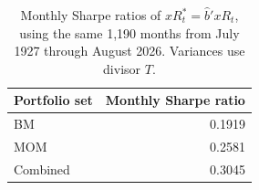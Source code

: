\begin{table}[!htbp]
  \centering
  \caption{Monthly Sharpe ratios of $xR_t^*=\hat b'xR_t$, using the same
  1,190 months from July 1927 through August 2026. Variances use divisor $T$.}
  \label{tab:q2c-monthly-sharpe-ratios}
  \small
  \begin{tabular}{lr}
    \toprule
    Portfolio set & Monthly Sharpe ratio \\
    \midrule
    BM & 0.1919 \\
    MOM & 0.2581 \\
    Combined & 0.3045 \\
    \bottomrule
  \end{tabular}
\end{table}
